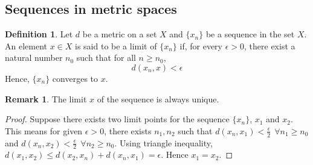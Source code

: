 \documentclass[12pt]{report}
\theoremstyle{definition}
\newtheorem{defn}{Definition}
\newtheorem*{rem}{Remark}
\begin{document}
\subsection*{Sequences in metric spaces}
\begin{defn}
    Let $d$ be a metric on a set $X$ and $\{x_n\}$ be a sequence in the set $X$. An element $x \in X$ is said to be a limit of $\{x_n\}$ if, for every $\epsilon > 0$, there exist a natural number $n_0$ such that for all $n \geq n_0$,
    $$ d(x_n, x) < \epsilon$$
    Hence, $\{x_n\}$ converges to $x$.
\end{defn}
\begin{rem}
    The limit $x$ of the sequence is always unique.
\end{rem}
\begin{proof}
    Suppose there exists two limit points for the sequence $\{x_n\}$, $x_1$ and $x_2$. This means for given $\epsilon > 0$, there exists $n_1,n_2$ such that $d(x_n , x_1) < \frac{\epsilon}{2}~~\forall n_1 \geq n_0$ and $d(x_n , x_2) < \frac{\epsilon}{2}~~\forall n_2 \geq n_0$. Using triangle inequality, $d(x_1, x_2) \leq d(x_2,x_n) + d(x_n, x_1) = \epsilon$. Hence $x_1 = x_2$.
\end{proof}
\end{document}
